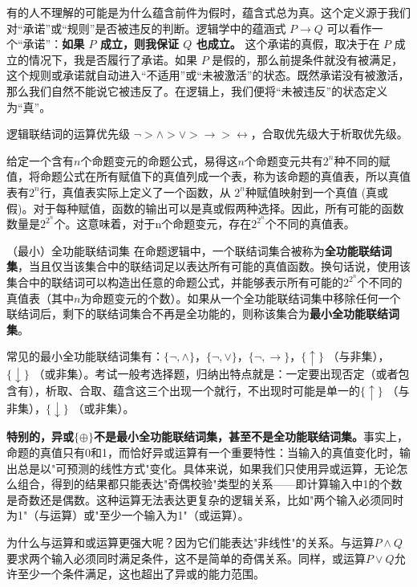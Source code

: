 有的人不理解的可能是为什么蕴含前件为假时，蕴含式总为真。这个定义源于我们对“承诺”或“规则”是否被违反的判断。逻辑学中的蕴涵式 $P \rightarrow Q$ 可以看作一个“承诺”：\textbf{如果 $P$ 成立，则我保证 $Q$ 也成立。} 这个承诺的真假，取决于在 $P$ 成立的情况下，我是否履行了承诺。如果 $P$ 是假的，那么前提条件就没有被满足，这个规则或承诺就自动进入“不适用”或“未被激活”的状态。既然承诺没有被激活，那么我们自然不能说它被违反了。在逻辑上，我们便将“未被违反”的状态定义为“真”。
\begin{definition}{逻辑联结词的运算优先级}{}
    $\neg> \land> \lor> \rightarrow> \leftrightarrow$，合取优先级大于析取优先级。
\end{definition}
给定一个含有$n$个命题变元的命题公式，易得这$n$个命题变元共有$2^n$种不同的赋值，将命题公式在所有赋值下的真值列成一个表，称为该命题的真值表，所以真值表有$2^n$行，真值表实际上定义了一个函数，从 $2^n$种赋值映射到一个真值 (真或假)。对于每种赋值，函数的输出可以是真或假两种选择。因此，所有可能的函数数量是$2^{2^n}$个。这意味着，对于n个命题变元，存在$2^{2^n}$个不同的真值表。
\begin{definition}{（最小）全功能联结词集}{}
    在命题逻辑中，一个联结词集合被称为\textbf{全功能联结词集}，当且仅当该集合中的联结词足以表达所有可能的真值函数。换句话说，使用该集合中的联结词可以构造出任意的命题公式，并能够表示所有可能的$2^{2^n}$个不同的真值表（其中$n$为命题变元的个数）。如果从一个全功能联结词集中移除任何一个联结词后，剩下的联结词集合不再是全功能的，则称该集合为\textbf{最小全功能联结词集}。
\end{definition}
常见的最小全功能联结词集有：$\{\neg, \land\}$，$\{\neg, \lor\}$，$\{\neg, \rightarrow\}$，$\{\uparrow\}$ （与非集），$\{\downarrow\}$ （或非集）。考试一般考选择题，归纳出特点就是：一定要出现否定（或者包含有），析取、合取、蕴含这三个出现一个就行，不出现时可能是单一的$\{\uparrow\}$ （与非集），$\{\downarrow\}$ （或非集）。

\textbf{特别的，异或$\{\oplus\}$不是最小全功能联结词集，甚至不是全功能联结词集。}事实上，命题的真值只有0和1，而恰好异或运算有一个重要特性：当输入的真值变化时，输出总是以"可预测的线性方式"变化。具体来说，如果我们只使用异或运算，无论怎么组合，得到的结果都只能表达"奇偶校验"类型的关系——即计算输入中1的个数是奇数还是偶数。这种运算无法表达更复杂的逻辑关系，比如"两个输入必须同时为1"（与运算）或"至少一个输入为1"（或运算）。

为什么与运算和或运算更强大呢？因为它们能表达"非线性"的关系。与运算$P \land Q$要求两个输入必须同时满足条件，这不是简单的奇偶关系。同样，或运算$P \lor Q$允许至少一个条件满足，这也超出了异或的能力范围。

